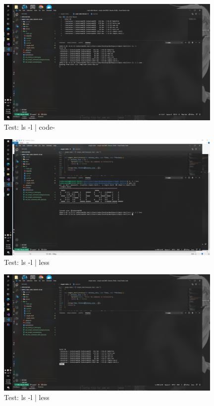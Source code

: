 \documentclass{article}
\begin{document}
\begin{figure}[H]
\centering
\includegraphics[width=0.98\textwidth]{wsl_two_command_with_pipe.png}
\caption{Test: ls -l | code- }
\end{figure}


\begin{figure}[H]
\centering
\includegraphics[width=0.98\textwidth]{wsl_two_command_with_pipe_01.png}
\caption{Test: ls -l | less}
\end{figure}

\begin{figure}[H]
\centering
\includegraphics[width=0.98\textwidth]{wsl_two_command_with_pipe_00.png}
\caption{Test: ls -l | less}
\end{figure}
\end{document}

